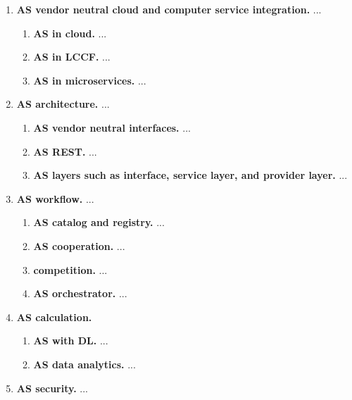 \begin{enumerate}

\item{\bf AS vendor neutral cloud and computer service integration.} ...

  \begin{enumerate}
  \item {\bf AS in cloud.} ...
  \item {\bf AS in LCCF.} ...
  \item {\bf AS in microservices.} ...
  \end{enumerate}

\item{\bf AS architecture.} ...

  \begin{enumerate}
  \item{\bf AS vendor neutral interfaces.} ...
  \item{\bf AS REST.} ...
  \item{\bf AS layers such as interface, service layer, and provider layer.} ...
  \end{enumerate}

\item{\bf AS workflow.} ...

  \begin{enumerate}
  \item{\bf AS catalog and registry.} ...
  \item{\bf AS cooperation.} ...
  \item{\bf competition.} ...
  \item{\bf AS orchestrator.} ...
  \end{enumerate}


\item{\bf AS calculation.}

  \begin{enumerate}
  \item{\bf AS with DL.} ...
  \item{\bf AS data analytics.} ...
  \end{enumerate}

\item{\bf AS security.} ...

\end{enumerate}


